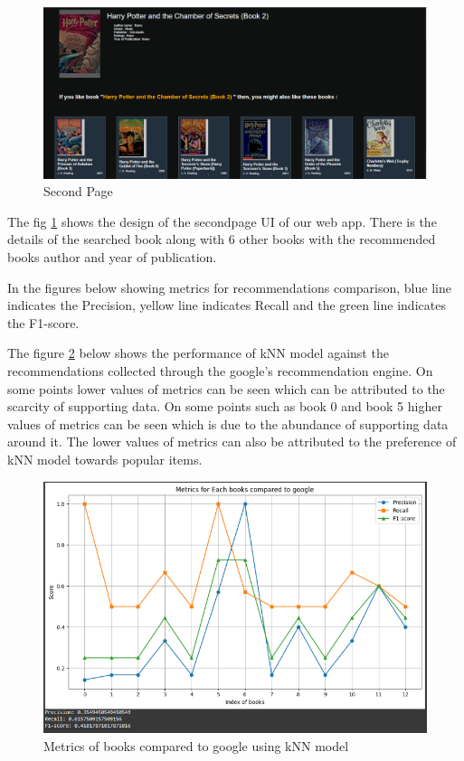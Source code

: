     \begin{figure}[h]
        \centering
        \includegraphics[width=0.9\linewidth]{img/Graphics/Secondpage.PNG}
        \caption{Second Page}
        \label{Secondpage}
    \end{figure}
    \newpage
    The fig \ref{Secondpage} shows the design of the secondpage UI of our web app. There is the details of the searched book along with 6 other books  with the recommended books author and year of publication.
    
    \newpage

    In the figures below showing metrics for recommendations comparison, blue line indicates the Precision, yellow line indicates Recall and the green line indicates the F1-score.

    The figure \ref{Metrics-knn-google} below shows the performance of kNN model against the recommendations collected through the google's recommendation engine. On some points lower values of metrics can be seen which can be attributed to the scarcity of supporting data. On some points such as book 0 and book 5 higher values of metrics can be seen which is due to the abundance of supporting data around it. The lower values of metrics can also be attributed to the preference of kNN model towards popular items.
    
    \begin{figure}[h]
        \centering
        \includegraphics[width=1\linewidth]{img/Graphics/knn_google.PNG}
        \caption{Metrics of books compared to google using kNN model}
        \label{Metrics-knn-google}
    \end{figure}
    \newpage

